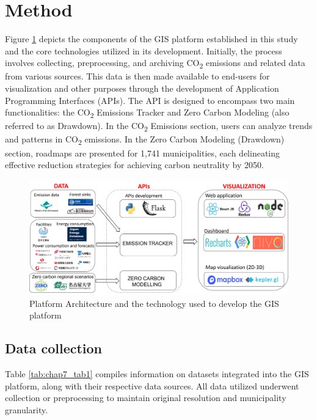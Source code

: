 \section{Method}
Figure \ref{fig:chap7_fig1} depicts the components of the GIS platform established in this study and the core technologies utilized in its development. Initially, the process involves collecting, preprocessing, and archiving CO\textsubscript{2} emissions and related data from various sources. This data is then made available to end-users for visualization and other purposes through the development of Application Programming Interfaces (APIs). The API is designed to encompass two main functionalities: the CO\textsubscript{2} Emissions Tracker and Zero Carbon Modeling (also referred to as Drawdown). In the CO\textsubscript{2} Emissions section, users can analyze trends and patterns in CO\textsubscript{2} emissions. In the Zero Carbon Modeling (Drawdown) section, roadmaps are presented for 1,741 municipalities, each delineating effective reduction strategies for achieving carbon neutrality by 2050.\par
\begin{figure}
  \centering
  \includegraphics[width=\textwidth]{figs/chap7/platform_architecture.png}
  \caption[Platform architecture]{Platform Architecture and the technology used to develop the GIS platform}
  \label{fig:chap7_fig1}
\end{figure}

\subsection{Data collection}
Table \ref{tab:chap7_tab1} compiles information on datasets integrated into the GIS platform, along with their respective data sources. All data utilized underwent collection or preprocessing to maintain original resolution and municipality granularity. \par

